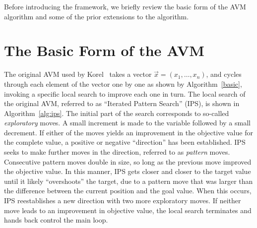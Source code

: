 \documentclass{llncs}
\newcommand{\name}{AVM\hspace{-1pt}$f$\xspace}
\begin{document}

Before introducing the framework, we briefly review the basic form of the AVM algorithm and some of the prior extensions to the algorithm.

\section{The Basic Form of the AVM}
\label{sec:basic}


The original AVM used by Korel~\cite{Korel1990} takes a vector $\vec{x} = (x_1, \dots, x_n)$, and cycles through each element of the vector one by one as shown by Algorithm~\ref{basic}, invoking a specific local search to improve each one in turn. The local search of the original AVM, referred to as ``Iterated Pattern Search'' (IPS), is shown in Algorithm~\ref{alg:ips}. The initial part of the search corresponds to so-called {\it exploratory} moves. A small increment is made to the variable followed by a small decrement. If either of the moves yields an improvement in the objective value for the complete value, a positive or negative ``direction'' has been established. IPS seeks to make further moves in the direction, referred to as {\it pattern} moves. Consecutive pattern moves double in size, so long as the previous move improved the objective value. In this manner, IPS gets closer and closer to the target value until it likely ``overshoots'' the target, due to a pattern move that was larger than the difference between the current position and the goal value. When this occurs, IPS reestablishes a new direction with two more exploratory moves. If neither move leads to an improvement in objective value, the local search terminates and hands back control the main loop.
\end{document}
